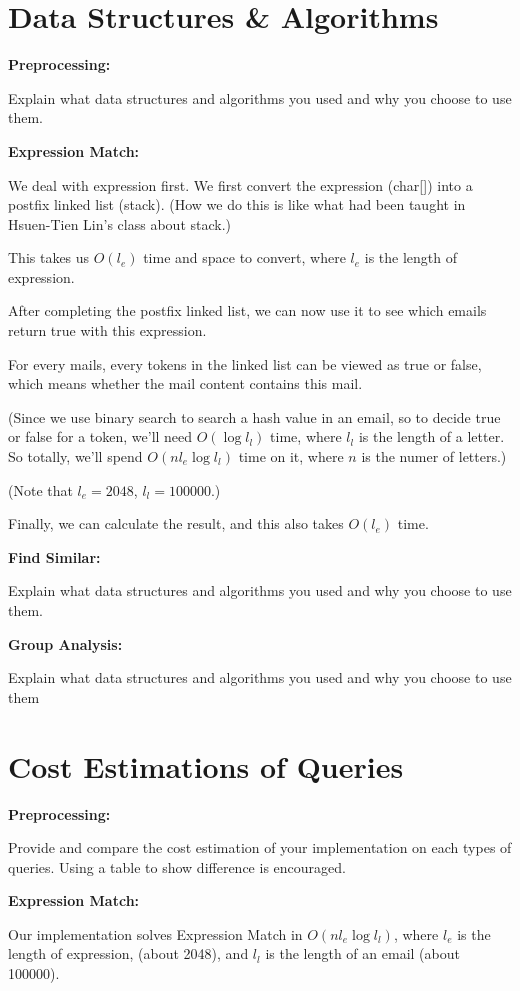 \documentclass{article}
\begin{document}
\section*{Data Structures \& Algorithms}

\textbf{Preprocessing:}

Explain what data structures and algorithms you used and why you choose to use them.

\textbf{Expression Match:}

We deal with expression first. We first convert the expression (char[]) into a postfix linked list (stack). (How we do this is like what had been taught in Hsuen-Tien Lin's class about stack.)

This takes us $O(l_e)$ time and space to convert, where $l_e$ is the length of expression.

After completing the postfix linked list, we can now use it to see which emails return true with this expression.

For every mails, every tokens in the linked list can be viewed as true or false, which means whether the mail content contains this mail.

(Since we use binary search to search a hash value in an email, so to decide true or false for a token, we'll need $O(\log l_l)$ time, where $l_l$ is the length of a letter. So totally, we'll spend $O(n l_e \log l_l)$ time on it, where $n$ is the numer of letters.)

(Note that $l_e = 2048$, $l_l = 100000$.)

Finally, we can calculate the result, and this also takes $O(l_e)$ time.

\textbf{Find Similar:}

Explain what data structures and algorithms you used and why you choose to use them.

\textbf{Group Analysis:}

Explain what data structures and algorithms you used and why you choose to use them

\section*{Cost Estimations of Queries}
\textbf{Preprocessing:}

Provide and compare the cost estimation of your implementation on each types of queries. Using a table to show difference is encouraged.

\textbf{Expression Match:}

Our implementation solves Expression Match in $O(n l_e \log l_l)$, where $l_e$ is the length of expression, (about 2048), and $l_l$ is the length of an email (about 100000).
\end{document}
